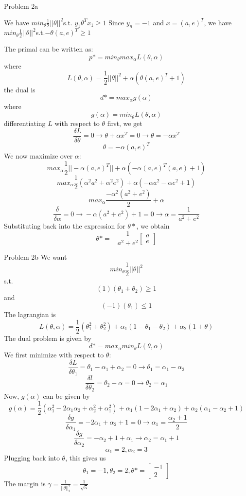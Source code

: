 \documentclass[11pt]{article}
\newcommand{\solution}[1]{{{\color{blue}{\bf Solution:} {#1}}}}
\begin{document}
\item Problem 2a
\solution{
We have $min_\theta \frac{1}{2} || \theta ||^2 $s.t.  $y_1 \theta^T x_1 \geq 1$ \newline{}
Since $y_n = -1$ and $x = (a,e)^T$, we have $min_\theta \frac{1}{2} || \theta ||^2 $s.t.$ - \theta (a,e)^T \geq 1$ \newline{}

The primal can be written as: \[ p* = min_{\theta} max_{\alpha} L(\theta, \alpha) \] where \[ L(\theta, \alpha) = \frac{1}{2} ||\theta||^2 + \alpha( \theta (a,e)^T + 1) \] the dual is \[ d* = max_\alpha g(\alpha) \] where \[ g(\alpha) = min_{\theta} L(\theta, \alpha) \] differentiating $L$ with respect to $\theta$ first, we get \[ \frac{\delta L}{\delta \theta} = 0 \rightarrow{} \theta + \alpha x^T =0 \rightarrow{} \theta = -\alpha x^T \] \[ \theta = -\alpha (a,e)^T \] We now maximize over $\alpha$: \[ max_\alpha \frac{1}{2} || -\alpha (a,e)^T || + \alpha( -\alpha(a,e)^T(a,e) + 1) \] \[ max_\alpha \frac{1}{2}(\alpha^2 a^2 + \alpha^2 e^2) + \alpha(-\alpha a^2 -\alpha e^2 + 1) \] \[ max_\alpha \frac{-\alpha^2(a^2 + e^2)}{2} + \alpha \] \[ \frac{\delta}{\delta \alpha} = 0 \rightarrow{} -\alpha(a^2 + e^2) + 1 =0 \rightarrow{} \alpha = \frac{1}{a^2 + e^2} \] Substituting back into the expression for $\theta*$, we obtain \[ \theta* = -\frac{1}{a^2 + e^2} \begin{bmatrix} a \\ e \end{bmatrix} \]
}
\item Problem 2b
\solution{
We want \[ min_\theta \frac{1}{2} || \theta||^2 \] s.t. \[(1)(\theta_1 + \theta_2) \geq 1 \] and \[ (-1)(\theta_1) \leq 1\]
The lagrangian is \[ L(\theta, \alpha) = \frac{1}{2}(\theta_1^2 + \theta_2^2) + \alpha_1(1 - \theta_1 -\theta_2) + \alpha_2(1 + \theta) \] The dual problem is given by \[ d* = max_\alpha min_\theta L(\theta, \alpha) \] We first minimize with respect to $\theta$: \[ \frac{\delta L}{\delta \theta_1} = \theta_1 -\alpha_1 + \alpha_2 = 0 \rightarrow{} \theta_1 = \alpha_1 - \alpha_2 \]
\[ \frac{\delta l}{\delta \theta_2} = \theta_2 - \alpha  = 0 \rightarrow{} \theta_2 = \alpha_1 \] 
Now, $g(\alpha)$ can be given by \[ g(\alpha) = \frac{1}{2} (\alpha_1^2 -2\alpha_1 \alpha_2 + \alpha_2^2 + \alpha_1^2) + \alpha_1(1 - 2\alpha_1 + \alpha_2) + \alpha_2(\alpha_1 - \alpha_2 + 1) \]
\[ \frac{\delta g}{\delta \alpha_1} = -2\alpha_1 + \alpha_2 + 1 = 0 \rightarrow{} \alpha_1 = \frac{\alpha_2 + 1}{2} \]
\[ \frac{\delta g}{\delta \alpha_2} = -\alpha_2 + 1 + \alpha_1 \rightarrow{} \alpha_2  = \alpha_1 + 1 \]
\[ \alpha_1 = 2, \alpha_2 = 3 \]
Plugging back into $\theta$, this gives us \[ \theta_1 = -1, \theta_2 = 2, \theta* = \begin{bmatrix} -1 \\ 2 \end{bmatrix} \]
The margin is $\gamma = \frac{1}{||\theta||_2^2} = \frac{1}{\sqrt{5}} $
}
\end{document}
